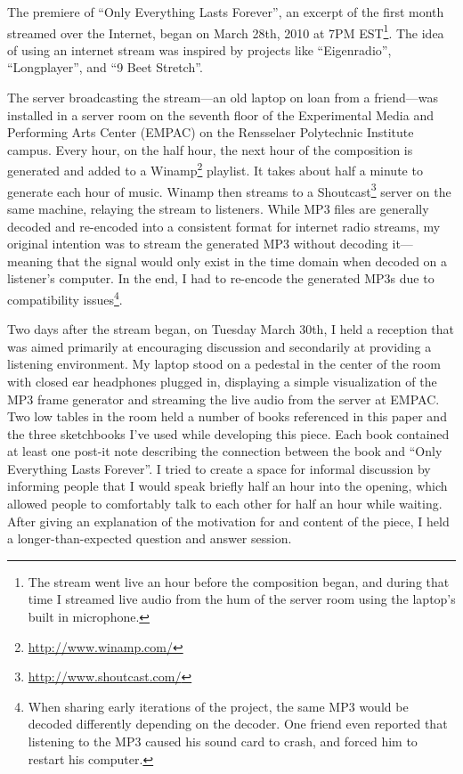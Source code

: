 \documentclass{thesis}
\begin{document}
The premiere of ``Only Everything Lasts Forever'', an excerpt of the first month streamed over the Internet, began on March 28th, 2010 at 7PM EST\footnote{The stream went live an hour before the composition began, and during that time I streamed live audio from the hum of the server room using the laptop's built in microphone.}. The idea of using an internet stream was inspired by projects like ``Eigenradio'', ``Longplayer'', and ``9 Beet Stretch''.

The server broadcasting the stream---an old laptop on loan from a friend---was installed in a server room on the seventh floor of the Experimental Media and Performing Arts Center (EMPAC) on the Rensselaer Polytechnic Institute campus. Every hour, on the half hour, the next hour of the composition is generated and added to a Winamp\footnote{\url{http://www.winamp.com/}} playlist. It takes about half a minute to generate each hour of music. Winamp then streams to a Shoutcast\footnote{\url{http://www.shoutcast.com/}} server on the same machine, relaying the stream to listeners. While MP3 files are generally decoded and re-encoded into a consistent format for internet radio streams, my original intention was to stream the generated MP3 without decoding it---meaning that the signal would only exist in the time domain when decoded on a listener's computer. In the end, I had to re-encode the generated MP3s due to compatibility issues\footnote{When sharing early iterations of the project, the same MP3 would be decoded differently depending on the decoder. One friend even reported that listening to the MP3 caused his sound card to crash, and forced him to restart his computer.}.

Two days after the stream began, on Tuesday March 30th, I held a reception that was aimed primarily at encouraging discussion and secondarily at providing a listening environment. My laptop stood on a pedestal in the center of the room with closed ear headphones plugged in, displaying a simple visualization of the MP3 frame generator and streaming the live audio from the server at EMPAC. Two low tables in the room held a number of books referenced in this paper and the three sketchbooks I've used while developing this piece. Each book contained at least one post-it note describing the connection between the book and ``Only Everything Lasts Forever''. I tried to create a space for informal discussion by informing people that I would speak briefly half an hour into the opening, which allowed people to comfortably talk to each other for half an hour while waiting. After giving an explanation of the motivation for and content of the piece, I held a longer-than-expected question and answer session.
\end{document}
